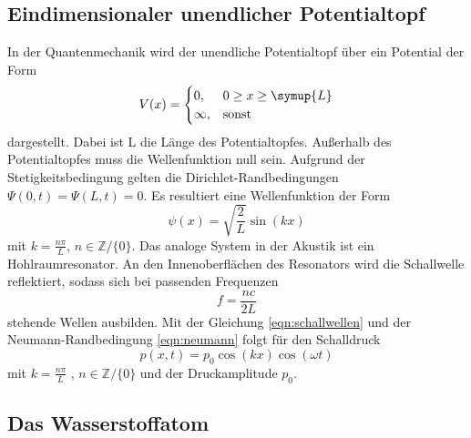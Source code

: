 \subsection{Eindimensionaler unendlicher Potentialtopf}
In der Quantenmechanik wird der unendliche Potentialtopf über ein Potential der Form
\begin{equation}
    V(x) = 
    \begin{cases}
        0 ,
        & 0 \ge x \ge \symup{L} \\
        \infty , & \text{sonst}
    \end{cases}
\end{equation}
dargestellt. Dabei ist L die Länge des Potentialtopfes. Außerhalb des Potentialtopfes muss die Wellenfunktion null sein.
Aufgrund der Stetigkeitsbedingung gelten die Dirichlet-Randbedingungen $\Psi(0,t) = \Psi(L,t) =0$.
Es resultiert eine Wellenfunktion der Form
\begin{equation}
    \psi(x) = \sqrt{\frac{2}{L}} \sin(kx)
    \label{eqn:psitopf}
\end{equation}
mit $k = \frac{n \pi}{L}$, $n \in \mathbb{Z}/\{0\}$.
Das analoge System in der Akustik ist ein Hohlraumresonator. An den Innenoberflächen des Resonators wird die Schallwelle reflektiert, sodass 
sich bei passenden Frequenzen
\begin{equation}
    f = \frac{n c}{2 L}
    \label{eqn:resonanzlin}
\end{equation}
stehende Wellen ausbilden.
Mit der Gleichung \ref{eqn:schallwellen} und der Neumann-Randbedingung \ref{eqn:neumann}
folgt für den Schalldruck
\begin{equation}
    p(x,t) = p_0 \cos(kx) \cos(\omega t)
\end{equation}
mit $k = \frac{n\pi}{L}$ , $n \in \mathbb{Z}/\{0\}$ und der Druckamplitude $p_0$.

\subsection{Das Wasserstoffatom}
